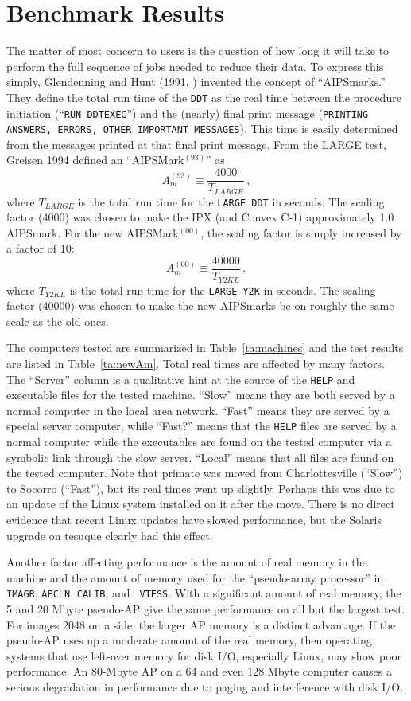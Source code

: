 \documentclass[twoside]{article}
\newcommand{\OMark}{AIPSMark$^{(93)}$}
\newcommand{\OM}{A_m^{(93)}}
\newcommand{\AMark}{AIPSMark$^{(00)}$}
\newcommand{\AM}{A_m^{(00)}}
\begin{document}
\section{Benchmark Results}

The matter of most concern to users is the question of how long it
will take to perform the full sequence of jobs needed to reduce their
data.  To express this simply, Glendenning and Hunt (1991,
\cite{kn:AM75}) invented the concept of ``AIPSmarks.''  They define
the total run time of the {\tt DDT} as the real time between the
procedure initiation (``{\tt RUN DDTEXEC}'') and the (nearly) final
print message ({\tt PRINTING ANSWERS, ERRORS, OTHER IMPORTANT
MESSAGES}).  This time is easily determined from the messages printed
at that final print message.  From the LARGE test, Greisen 1994
\cite{kn:AM85} defined an ``\OMark'' as
$$
        \OM \equiv \frac{4000}{T_{LARGE}} \, ,
$$
where $T_{LARGE}$ is the total run time for the {\tt LARGE DDT} in
seconds.  The scaling factor (4000) was chosen to make the IPX (and
Convex C-1) approximately 1.0 AIPSmark.  For the new \AMark, the
scaling factor is simply increased by a factor of 10:
$$
        \AM \equiv \frac{40000}{T_{Y2KL}} \, ,
$$
where $T_{Y2KL}$ is the total run time for the {\tt LARGE Y2K} in
seconds.  The scaling factor (40000) was chosen to make the new
AIPSmarks be on roughly the same scale as the old ones.

The computers tested are summarized in Table~\ref{ta:machines} and the
test results are listed in Table~\ref{ta:newAm}.  Total real times are
affected by many factors.  The ``Server'' column is a qualitative hint
at the source of the {\tt HELP} and executable files for the tested
machine.  ``Slow'' means they are both served by a normal computer in
the local area network.  ``Fast'' means they are served by a special
server computer, while ``Fast?'' means that the {\tt HELP} files are
served by a normal computer while the executables are found on the
tested computer via a symbolic link through the slow server.
``Local''  means that all files are found on the tested computer.
Note that primate was moved from Charlottesville (``Slow'') to Socorro
(``Fast''), but its real times went up slightly.  Perhaps this was due
to an update of the Linux system installed on it after the move.
There is no direct evidence that recent Linux updates have slowed
performance, but the Solaris upgrade on tesuque clearly had this
effect.

Another factor affecting performance is the amount of real memory in
the machine and the amount of memory used for the ``pseudo-array
processor'' in {\tt IMAGR}, {\tt APCLN}, {\tt CALIB}, and {\tt
VTESS}\@.  With a significant amount of real memory, the 5 and 20
Mbyte pseudo-AP give the same performance on all but the largest test.
For images 2048 on a side, the larger AP memory is a distinct
advantage.  If the pseudo-AP uses up a moderate amount of the real
memory, then operating systems that use left-over memory for disk I/O,
especially Linux, may show poor performance.  An 80-Mbyte AP on a 64
and even 128 Mbyte computer causes a serious degradation in
performance due to paging and interference with disk I/O.
\end{document}
